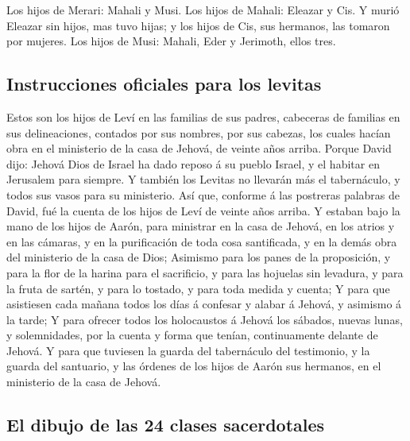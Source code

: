  Los hijos de Merari: Mahali y Musi. Los hijos de Mahali:
Eleazar y Cis.  Y murió Eleazar sin hijos, mas tuvo
hijas; y los hijos de Cis, sus hermanos, las tomaron por mujeres.
 Los hijos de Musi: Mahali, Eder y Jerimoth, ellos tres.

\hypertarget{instrucciones-oficiales-para-los-levitas}{%
\subsection{Instrucciones oficiales para los
levitas}\label{instrucciones-oficiales-para-los-levitas}}

 Estos son los hijos de Leví en las familias de sus
padres, cabeceras de familias en sus delineaciones, contados por sus
nombres, por sus cabezas, los cuales hacían obra en el ministerio de la
casa de Jehová, de veinte años arriba.  Porque David
dijo: Jehová Dios de Israel ha dado reposo á su pueblo Israel, y el
habitar en Jerusalem para siempre.  Y también los Levitas
no llevarán más el tabernáculo, y todos sus vasos para su ministerio.
 Así que, conforme á las postreras palabras de David, fué
la cuenta de los hijos de Leví de veinte años arriba.  Y
estaban bajo la mano de los hijos de Aarón, para ministrar en la casa de
Jehová, en los atrios y en las cámaras, y en la purificación de toda
cosa santificada, y en la demás obra del ministerio de la casa de Dios;
 Asimismo para los panes de la proposición, y para la
flor de la harina para el sacrificio, y para las hojuelas sin levadura,
y para la fruta de sartén, y para lo tostado, y para toda medida y
cuenta;  Y para que asistiesen cada mañana todos los días
á confesar y alabar á Jehová, y asimismo á la tarde;  Y
para ofrecer todos los holocaustos á Jehová los sábados, nuevas lunas, y
solemnidades, por la cuenta y forma que tenían, continuamente delante de
Jehová.  Y para que tuviesen la guarda del tabernáculo
del testimonio, y la guarda del santuario, y las órdenes de los hijos de
Aarón sus hermanos, en el ministerio de la casa de Jehová.

\hypertarget{el-dibujo-de-las-24-clases-sacerdotales}{%
\subsection{El dibujo de las 24 clases
sacerdotales}\label{el-dibujo-de-las-24-clases-sacerdotales}}

